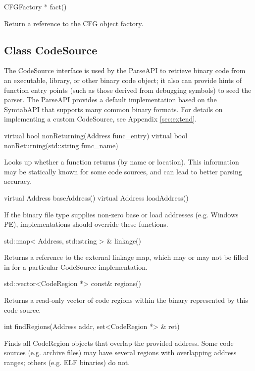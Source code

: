 \documentclass{article}
\newenvironment{apient}{\small\verbatim}{\endverbatim}
\newcommand{\apidesc}[1]{%
{\addtolength{\leftskip}{4em}%
#1\par\medskip}
}
\begin{document}
\begin{apient}
CFGFactory * fact()
\end{apient}
\apidesc{Return a reference to the CFG object factory.}

\subsection{Class CodeSource}
\label{sec:codesource}

The CodeSource interface is used by the ParseAPI to retrieve binary code from an executable, library, or other binary code object; it also can provide hints of function entry points (such as those derived from debugging symbols) to seed the parser. The ParseAPI provides a default implementation based on the SymtabAPI that supports many common binary formats. For details on implementing a custom CodeSource, see Appendix \ref{sec:extend}.

\begin{apient}
virtual bool nonReturning(Address func_entry)
virtual bool nonReturning(std::string func_name)
\end{apient}
\apidesc{Looks up whether a function returns (by name or location). This information may be statically known for some code sources, and can lead to better parsing accuracy.}

\begin{apient}
virtual Address baseAddress()
virtual Address loadAddress()
\end{apient}
\apidesc{If the binary file type supplies non-zero base or load addresses (e.g. Windows PE), implementations should override these functions.}

\begin{apient}
std::map< Address, std::string > & linkage()
\end{apient}
\apidesc{Returns a reference to the external linkage map, which may or may not be filled in for a particular CodeSource implementation.}

\begin{apient}
std::vector<CodeRegion *> const& regions()
\end{apient}
\apidesc{Returns a read-only vector of code regions within the binary represented by this code source.}

\begin{apient}
int findRegions(Address addr, set<CodeRegion *> & ret)
\end{apient}
\apidesc{Finds all CodeRegion objects that overlap the provided address. Some code sources (e.g. archive files) may have several regions with overlapping address ranges; others (e.g. ELF binaries) do not.}
\end{document}
